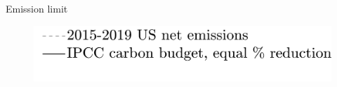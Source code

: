 \documentclass[11pt,aspectratio=169]{beamer}
\begin{document}
\begin{frame}{Emission limit}
\begin{center}
\begin{minipage}{0.6\textwidth}
\begin{figure}
			\end{figure}
		\end{minipage}
		\hspace{-10mm}
		\begin{minipage}{0.3\textwidth}
			\begin{figure}
				\includegraphics[width=1.4\textwidth]{../codding_model/own_basedOnFried/optimalPol_010922_revision/figures/all_13Sept22_Tplus30/Emnet_goals_o0_lgd1_crop.png}
			\end{figure}
		\end{minipage}
	\end{center}
\end{frame}
\end{document}
